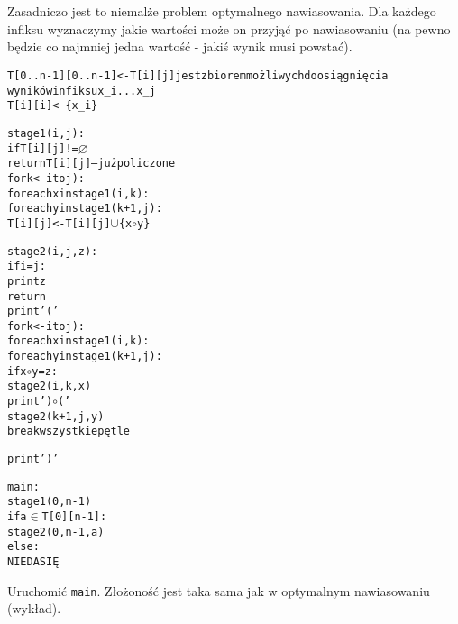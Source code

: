 \documentclass[a4paper,12pt]{article}
\begin{document}
\section{}
Zasadniczo jest to niemalże problem optymalnego nawiasowania. Dla każdego infiksu wyznaczymy jakie wartości może on przyjąć po nawiasowaniu (na pewno będzie co najmniej jedna wartość - jakiś wynik musi powstać). 
\begin{alltt}
 T[0..n-1][0..n-1] <- T[i][j] jest zbiorem możliwych do osiągnięcia
                                wyników infiksu x_i ... x_j
 T[i][i] <- \{x_i\}
 
 stage1(i,j):
    if T[i][j]!=\(\varnothing\)
        return T[i][j] -- już policzone
    for k <- i to j):
        for each x in stage1(i,k):
            for each y in stage1(k+1,j):
                T[i][j] <- T[i][j] \(\cup\) \{x\(\circ\)y\}

 stage2(i,j,z):
    if i = j:
        print z
        return
    print '('
    for k <- i to j):
        for each x in stage1(i,k):
            for each y in stage1(k+1,j):
                if x\(\circ\)y = z:
                    stage2(i,k,x)
                    print ')\(\circ\)('
                    stage2(k+1,j,y)
                    break wszystkie pętle
                    
    print ')'
    
 main:
    stage1(0,n-1)
    if a \(\in\) T[0][n-1]:
        stage2(0,n-1,a)
    else:
        NIE DA SIĘ
\end{alltt}
Uruchomić \verb|main|. Złożoność jest taka sama jak w optymalnym nawiasowaniu (wykład).
\end{document}
